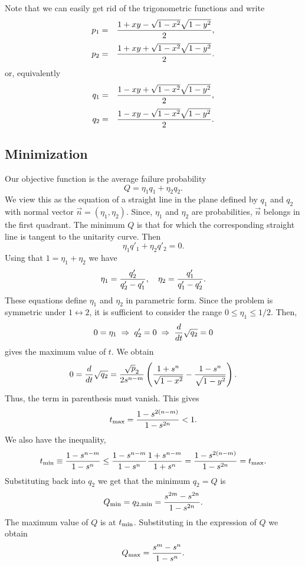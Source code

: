 \documentclass[a4]{article}
\begin{document}
Note that we can easily get rid of the trigonometric functions and write
%
\begin{eqnarray*}
p_1&=&{1+xy-\sqrt{1-x^2}\sqrt{1-y^2}\over2},\\[.2em]
p_2&=&{1+xy+\sqrt{1-x^2}\sqrt{1-y^2}\over2}.
\end{eqnarray*}
%
or, equivalently
%
\begin{eqnarray*}
q_1&=&{1-xy+\sqrt{1-x^2}\sqrt{1-y^2}\over2},\\[.2em]
q_2&=&{1-xy-\sqrt{1-x^2}\sqrt{1-y^2}\over2}.
\end{eqnarray*}
%

\subsection{Minimization}

Our objective function is the average failure probability
$$
Q=\eta_1 q_1+\eta_2 q_2 .
$$
We view this as the equation of a straight line in the plane defined by $q_1$ and $q_2$ with normal vector $\vec n=(\eta_1,\eta_2)$. Since, $\eta_1$ and $\eta_2$ are probabilities, $\vec n$ belongs in the first quadrant. The minimum $Q$ is  that for which the corresponding straight line is tangent to the unitarity curve. Then
$$
\eta_1 q'_1+\eta_2 q'_2=0.
$$
Using that $1=\eta_1+\eta_2$ we have
$$
\eta_1={q'_2\over q'_2-q'_1},\quad \eta_2={q'_1\over q'_1-q'_2}.
$$
These equations define $\eta_1$ and $\eta_2$ in parametric form. 
Since the problem is symmetric under $1\leftrightarrow2$, it is sufficient to consider the range $0\le\eta_1\le 1/2$.
Then,
$$
0=\eta_1\;\Rightarrow\; q'_2=0\;\Rightarrow\; {d\over dt}\sqrt{q_2}=0
$$
gives the maximum value of $t$. We obtain
$$
0={d\over dt}\sqrt{q_2}={\sqrt p_2\over2s^{n-m}}\left({1+s^n\over\sqrt{1-x^2}}-{1-s^n\over\sqrt{1-y^2}}\right).
$$
Thus, the term in parenthesis must vanish. This gives
$$
t_{\rm max}={1-s^{2(n-m)}\over1-s^{2n}}<1.
$$
We also have the inequality,
$$
t_{\rm min}\equiv {1-s^{n-m}\over1-s^n}\le{1-s^{n-m}\over1-s^n}{1+s^{n-m}\over1+s^n}={1-s^{2(n-m)}\over1-s^{2n}}
=t_{\rm max} .
$$
Substituting back into $q_2$ we get that the minimum $q_2=Q$ is
$$
Q_{\rm min}=q_{2,{\rm min}}={s^{2m}-s^{2n}\over 1-s^{2n}}.
$$
The maximum value of $Q$ is at $t_{\rm min}$. Substituting in the expression of $Q$ we obtain
$$
Q_{\rm max}={s^m-s^n\over1-s^n}.
$$
\end{document}
